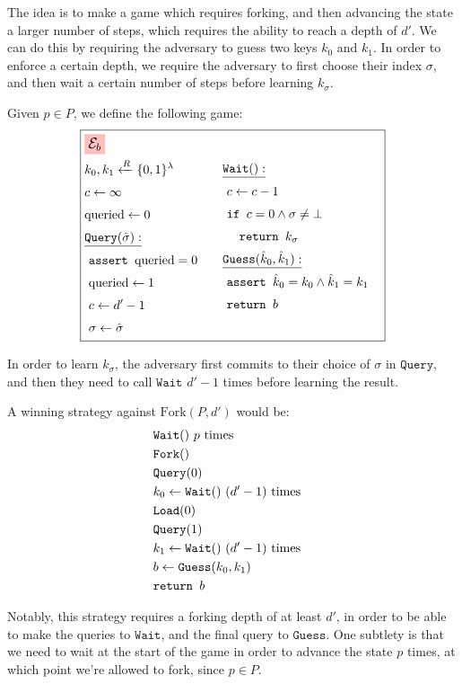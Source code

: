 The idea is to make a game which requires forking, and then advancing
the state a larger number of steps, which requires the ability to
reach a depth of $d'$.
We can do this by requiring the adversary to guess two keys $k_0$ and $k_1$.
In order to enforce a certain depth, we require the adversary to first
choose their index $\sigma$, and then wait a certain number of steps
before learning $k_\sigma$.

Given $p \in P$, we define the following game:
$$
\boxed{
\begin{aligned}
&\colorbox{pink}{\large $\mathcal{E}_b$}\cr
&\begin{aligned}
    &k_0, k_1 \xleftarrow{R} \{0, 1\}^\lambda\cr
    &c \gets \infty\cr
    &\text{queried} \gets 0\cr
    &\underline{\texttt{Query}(\hat{\sigma}):}\cr
    &\ \texttt{assert } \text{queried} = 0\cr
    &\ \text{queried} \gets 1\cr
    &\ c \gets d' - 1\cr
    &\ \sigma \gets \hat{\sigma}
\end{aligned}
&\begin{aligned}
    &\underline{\texttt{Wait}():}\cr
    &\ c \gets c - 1\cr
    &\ \texttt{if } c = 0 \land \sigma \neq \bot\cr
    &\ \quad \texttt{return } k_\sigma\cr
    &\underline{\texttt{Guess}(\hat{k}_0, \hat{k}_1):}\cr
    &\ \texttt{assert } \hat{k}_0 = k_0 \land \hat{k}_1 = k_1\cr
    &\ \texttt{return } b\cr
    &\cr
\end{aligned}\cr
\end{aligned}
}
$$

In order to learn $k_\sigma$, the adversary first commits to their choice
of $\sigma$ in $\texttt{Query}$, and then they need to call $\texttt{Wait}$
$d' - 1$
times before learning the result.

A winning strategy against $\text{Fork}(P, d')$ would be:
$$
\begin{aligned}
&\texttt{Wait}()\ p \text{ times}\cr
&\texttt{Fork}()\cr
&\texttt{Query}(0)\cr
&k_0 \gets \texttt{Wait}()\ (d' - 1) \text{ times}\cr
&\texttt{Load}(0)\cr
&\texttt{Query}(1)\cr
&k_1 \gets \texttt{Wait}()\ (d' - 1) \text{ times}\cr
&b \gets \texttt{Guess}(k_0, k_1)\cr
&\texttt{return } b\cr
\end{aligned}
$$

Notably, this strategy requires a forking depth of at least $d'$,
in order to be able to make the queries to $\texttt{Wait}$,
and the final query to $\texttt{Guess}$.
One subtlety is that we need to wait at the start of the game in order
to advance the state $p$ times, at which point we're allowed to fork,
since $p \in P$.

